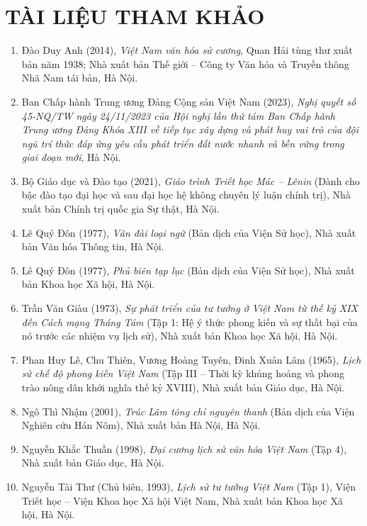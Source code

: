 \section*{TÀI LIỆU THAM KHẢO}

\begin{enumerate}
    \item Đào Duy Anh (2014), \textit{Việt Nam văn hóa sử cương}, Quan Hải tùng thư xuất bản năm 1938; Nhà xuất bản Thế giới -- Công ty Văn hóa và Truyền thông Nhã Nam tái bản, Hà Nội.
    \item Ban Chấp hành Trung ương Đảng Cộng sản Việt Nam (2023), \textit{Nghị quyết số 45-NQ/TW ngày 24/11/2023 của Hội nghị lần thứ tám Ban Chấp hành Trung ương Đảng Khóa XIII về tiếp tục xây dựng và phát huy vai trò của đội ngũ trí thức đáp ứng yêu cầu phát triển đất nước nhanh và bền vững trong giai đoạn mới}, Hà Nội.
    \item Bộ Giáo dục và Đào tạo (2021), \textit{Giáo trình Triết học Mác -- Lênin} (Dành cho bậc đào tạo đại học và sau đại học hệ không chuyên lý luận chính trị), Nhà xuất bản Chính trị quốc gia Sự thật, Hà Nội.
    \item Lê Quý Đôn (1977), \textit{Vân đài loại ngữ} (Bản dịch của Viện Sử học), Nhà xuất bản Văn hóa Thông tin, Hà Nội.
    \item Lê Quý Đôn (1977), \textit{Phủ biên tạp lục} (Bản dịch của Viện Sử học), Nhà xuất bản Khoa học Xã hội, Hà Nội.
    \item Trần Văn Giàu (1973), \textit{Sự phát triển của tư tưởng ở Việt Nam từ thế kỷ XIX đến Cách mạng Tháng Tám} (Tập 1: Hệ ý thức phong kiến và sự thất bại của nó trước các nhiệm vụ lịch sử), Nhà xuất bản Khoa học Xã hội, Hà Nội.
    \item Phan Huy Lê, Chu Thiên, Vương Hoàng Tuyên, Đinh Xuân Lâm (1965), \textit{Lịch sử chế độ phong kiến Việt Nam} (Tập III -- Thời kỳ khủng hoảng và phong trào nông dân khởi nghĩa thế kỷ XVIII), Nhà xuất bản Giáo dục, Hà Nội.
    \item Ngô Thì Nhậm (2001), \textit{Trúc Lâm tông chỉ nguyên thanh} (Bản dịch của Viện Nghiên cứu Hán Nôm), Nhà xuất bản Hà Nội, Hà Nội.
    \item Nguyễn Khắc Thuần (1998), \textit{Đại cương lịch sử văn hóa Việt Nam} (Tập 4), Nhà xuất bản Giáo dục, Hà Nội.
    \item Nguyễn Tài Thư (Chủ biên, 1993), \textit{Lịch sử tư tưởng Việt Nam} (Tập 1), Viện Triết học -- Viện Khoa học Xã hội Việt Nam, Nhà xuất bản Khoa học Xã hội, Hà Nội.

\end{enumerate}
